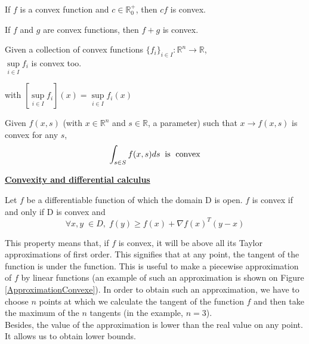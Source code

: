 \begin{myproperty}
If $f$ is a convex function and $c \in \mathbb{R}_0^+$, then $cf$ is convex.  
\end{myproperty}

\begin{myproperty}
If $f$ and $g$ are convex functions, then $f+g$ is convex. 
\end{myproperty}

\begin{myproperty}
Given a collection of convex functions $\{f_i\}_{i \in I}: \mathbb{R}^n \rightarrow \mathbb{R}$, \\
$\sup \limits _{i \in I}f_i$ is convex too. 
\end{myproperty}
with $\left[ \sup \limits _{i \in I} f_i\right] (x)= \sup \limits _{i \in I} f_i(x)$

\begin{myproperty}
Given $f(x,s)$ (with $x \in \mathbb{R}^n$ and $s \in \mathbb{R}$, a parameter) such that $x \rightarrow f(x,s)$ is convex for any $s$, 
$$\int_{s \in S}f(x,s)ds\;\; \text{is \;convex}$$
\end{myproperty}

\bigskip

\bigskip

\underline{\textbf{Convexity and differential calculus}}
\begin{myproperty}
Let $f$ be a differentiable function of which the domain D is open. 
$f$ is convex if and only if D is convex and
$$\forall x,y \; \in D, \;f(y)\geq f(x)+\nabla f(x)^T(y-x) $$
\end{myproperty}
This property means that, if $f$ is convex, it will be above all its Taylor approximations of first order. This signifies that at any point, the tangent of the function is under the function. This is useful to make a piecewise approximation of $f$ by linear functions (an example of such an approximation is shown on Figure \ref{ApproximationConvexe}). In order to obtain such an approximation, we have to choose $n$ points at which we calculate the tangent of the function $f$ and then take the maximum of the $n$ tangents (in the example, $n=3$). \\
Besides, the value of the approximation is lower than the real value on any point. It allows us to obtain lower bounds. 
\\

